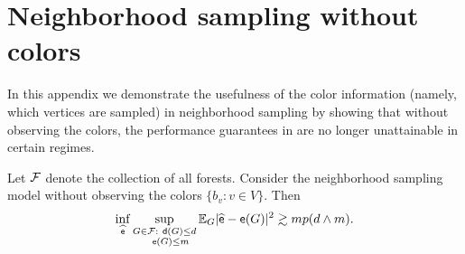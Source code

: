 \section{Neighborhood sampling without colors}
\label{app:nocolor}
In this appendix we demonstrate the usefulness of the color information (namely, which vertices are sampled) in neighborhood sampling by showing that without observing the colors, the performance guarantees in  are no longer unattainable in certain regimes.

\begin{theorem} \label{thm:unlabelled}
Let $ {\mathcal{F}} $ denote the collection of all forests. Consider the neighborhood sampling model without observing the colors $ \{ b_v : v\in V \} $. Then
\begin{equation} \label{eq:nolabel}
\inf_{\widehat{{\mathsf{e}}}}\sup_{\substack{G \in {\mathcal{F}}: ~{\mathsf{d}}(G)\leq d\\ ~~~{\mathsf{e}}(G) \leq m}}\mathbb{E}_G|\widehat{{\mathsf{e}}}-{\mathsf{e}}(G)|^2 \gtrsim mp( d\wedge m).
\end{equation}
\end{theorem}
